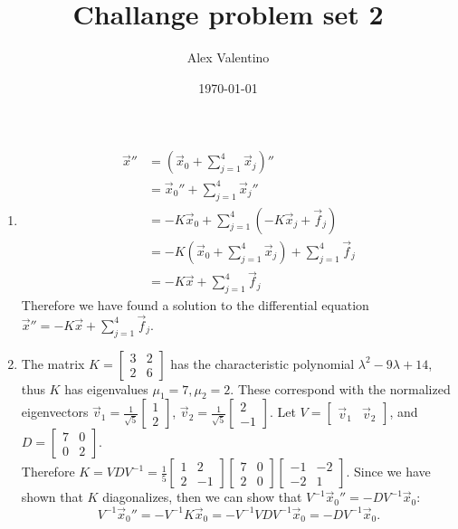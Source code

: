 \documentclass[12pt, letterpaper]{article}
\date{\today}
\author{Alex Valentino}
\title{Challange problem set 2}
\begin{document}
\begin{enumerate}
	\item 
	\begin{align*}
		\Vec{x}'' &= (\Vec{x}_0 + \sum_{j = 1}^4 \Vec{x}_j)''\\
		&= \Vec{x}_0'' + \sum_{j = 1}^4 \Vec{x}_j''\\
		&= -K \Vec{x}_0 + \sum_{j = 1}^4  (-K \Vec{x}_j + \Vec{f}_j)\\
		&= -K(\Vec{x}_0 + \sum_{j = 1}^4 \Vec{x}_j) + \sum_{j = 1}^4 \Vec{f}_j\\
		&= -K \Vec{x} + \sum_{j = 1}^4 \Vec{f}_j
	\end{align*}
	Therefore we have found a solution to the differential equation $\Vec{x}'' = -K \Vec{x} + \sum_{j = 1}^4 \Vec{f}_j$.
	\item The matrix $K = \begin{bmatrix}
	3 & 2\\ 2 & 6
	\end{bmatrix}$ has the characteristic polynomial $\lambda^2 -9 \lambda + 14$, thus $K$ has eigenvalues $\mu_1 = 7, \mu_2 = 2$.  These correspond with the normalized eigenvectors $\Vec{v}_1 = \frac{1}{\sqrt{5}} \begin{bmatrix}1 \\ 2	\end{bmatrix}$,
	 $\Vec{v}_2 = \frac{1}{\sqrt{5}} \begin{bmatrix}2 \\ -1	\end{bmatrix}$.  Let $V = \begin{bmatrix} 
	 \Vec{v}_1 &\Vec{v}_2\end{bmatrix}$, and $D = \begin{bmatrix} 7 & 0 \\ 0 & 2 \end{bmatrix}$.\\  Therefore $K = V D V^{-1} = 
	 \frac{1}{5}\begin{bmatrix} 1 & 2 \\ 2 & -1\end{bmatrix}\begin{bmatrix}7 & 0 \\ 2 & 0 \end{bmatrix} \begin{bmatrix}-1 & -2\\ -2 & 1\end{bmatrix}$.  
	 Since we have shown that $K$ diagonalizes, then we can show that $V^{-1}\Vec{x}_0'' =  -D V^{-1}\Vec{x}_0$:
	 $$
		V^{-1}\Vec{x}_0'' = 	-V^{-1} K \Vec{x}_0 = - V^{-1} V D V^{-1} \Vec{x}_0 = -D V^{-1}\Vec{x}_0.
$$
\end{enumerate}
\end{document}
